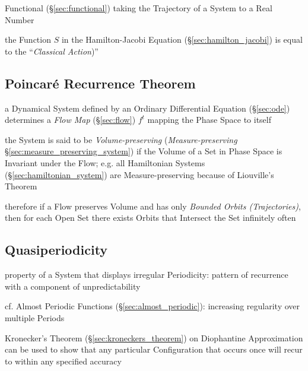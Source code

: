 Functional (\S\ref{sec:functional}) taking the Trajectory of a System to a Real
Number

the Function $S$ in the Hamilton-Jacobi Equation (\S\ref{sec:hamilton_jacobi})
is equal to the ``\emph{Classical Action})''



\subsection{Poincar\'e Recurrence Theorem}\label{sec:poincare_recurrence}

a Dynamical System defined by an Ordinary Differential Equation
(\S\ref{sec:ode}) determines a \emph{Flow Map} (\S\ref{sec:flow}) $f^t$ mapping
the Phase Space to itself

the System is said to be \emph{Volume-preserving} (\emph{Measure-preserving}
\S\ref{sec:measure_preserving_system}) if the Volume of a Set in Phase Space is
Invariant under the Flow;
e.g. all Hamiltonian Systems (\S\ref{sec:hamiltonian_system}) are
Measure-preserving because of Liouville's Theorem

therefore if a Flow preserves Volume and has only \emph{Bounded Orbits
  (Trajectories)}, then for each Open Set there exists Orbits that Intersect
the Set infinitely often



\subsection{Quasiperiodicity}\label{sec:quasiperiodicity}

property of a System that displays irregular Periodicity: pattern of recurrence
with a component of unpredictability

cf. Almost Periodic Functions (\S\ref{sec:almost_periodic}): increasing
regularity over multiple Periods

Kronecker's Theorem (\S\ref{sec:kroneckers_theorem}) on Diophantine
Approximation can be used to show that any particular Configuration that occurs
once will recur to within any specified accuracy



